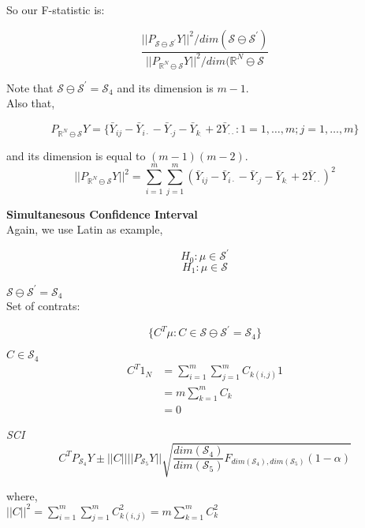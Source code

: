 \documentclass[11pt,fleqn]{book} %
\begin{document}
So our F-statistic is:

		$$\frac{|| P_{\mathcal{S} \ominus \mathcal{S}^\prime} Y ||^2 / dim( \mathcal{S} \ominus \mathcal{S}^\prime)}{|| P_{\mathbb{R}^N \ominus \mathcal{S}} Y ||^2 / dim(\mathbb{R}^N \ominus \mathcal{S}} $$


Note that $\mathcal{S} \ominus \mathcal{S}^\prime = \mathcal{S}_4$ and its dimension is $m - 1$. \\

Also that, 

		$$ P_{\mathbb{R}^N \ominus \mathcal{S}} Y = \{\bar{Y}_{ij} - \bar{Y}_{i\cdot} - \bar{Y}_{\cdot j} - \bar{Y}_{k_\cdot} + 2 \bar{Y}_{\cdot \cdot}: 1 = 1, \dots, m; j= 1, \dots, m\}$$

and its dimension is equal to $(m-1)(m-2)$.\\

		$$|| P_{\mathbb{R}^N \ominus \mathcal{S}} Y ||^2 = \sum^m_{i=1} \sum^m_{j=1} ( \bar{Y}_{ij} - \bar{Y}_{i\cdot} - \bar{Y}_{\cdot j} - \bar{Y}_{k_\cdot} + 2 \bar{Y}_{\cdot \cdot} ) ^2$$


\textbf{Simultanesous Confidence Interval}\\

Again, we use Latin as example, 

		$$H_0: \mu \in \mathcal{S}^\prime $$
		$$H_1: \mu \in \mathcal{S}$$

$\mathcal{S} \ominus \mathcal{S}^\prime = \mathcal{S}_4$\\

Set of contrats: 
		
		$$\{C^T \mu : C \in \mathcal{S} \ominus \mathcal{S}^\prime = \mathcal{S}_4  \} $$

$C \in \mathcal{S}_4$\\


\begin{align}
	C^T 1_N &= \sum^m_{i=1} \sum^m_{j=1} C_{k(i,j)} 1\\
			&= m \sum^m_{k=1}  C_{k}\\
			&= 0
\end{align}



\textit{SCI}\\

		$$C^T P_{\mathcal{S}_4} Y \pm ||C|| ||P_{\mathcal{S}_5}  Y|| \sqrt{\frac{dim(\mathcal{S}_4)}{dim(\mathcal{S}_5)} F_{dim(\mathcal{S}_4), dim(\mathcal{S}_5) } (1 - \alpha)} $$

where,\\
$||C||^2 = \sum^m_{i=1} \sum^m_{j=1} C^2_{k(i,j)} = m \sum^m_{k=1}  C^2_{k}$\\
\end{document}
